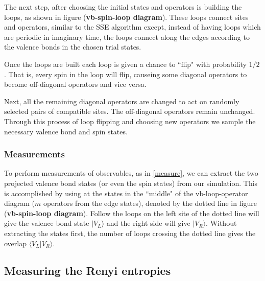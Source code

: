 \documentclass[prb,aps,twocolumn,floatfix,amsmath,amssymb,superscriptaddress,tightenlines]{revtex4}
\begin{document}
The next step, after choosing the initial states and operators is building the loops, as shown in figure ({\bf \!vb-spin-loop diagram}). 
These loops connect sites and operators, similar to the SSE algorithm except, instead of having loops which are periodic in imaginary time, the loops connect along the edges according to the valence bonds in the chosen trial states.

Once the loops are built each loop is given a chance to ``flip" with probability $1/2$.  That is, every spin in the loop will flip, causeing some diagonal operators to become off-diagonal operators and vice versa.  

Next, all the remaining diagonal operators are changed to act on randomly selected pairs of compatible sites.
The off-diagonal operators remain unchanged.
Through this process of loop flipping and choosing new operators we sample the necessary valence bond and spin states.

\subsubsection{Measurements}

To perform measurements of observables, as in \eqref{measure}, we can extract the two projected valence bond states (or even the spin states) from our simulation.  
This  is accomplished by using at the states in the ``middle" of the vb-loop-operator diagram ($m$ operators from the edge states), denoted by the dotted line in figure ({\bf \!vb-spin-loop diagram}).
Follow the loops on the left site of the dotted line will give the valence bond state $\lvert V_L \rangle$ and the right side will give $\lvert V_R \rangle$.
Without extracting the states first, the number of loops crossing the dotted line gives the overlap $\langle V_L \lvert V_R \rangle $.

\subsection{Measuring the Renyi entropies}
\end{document}
